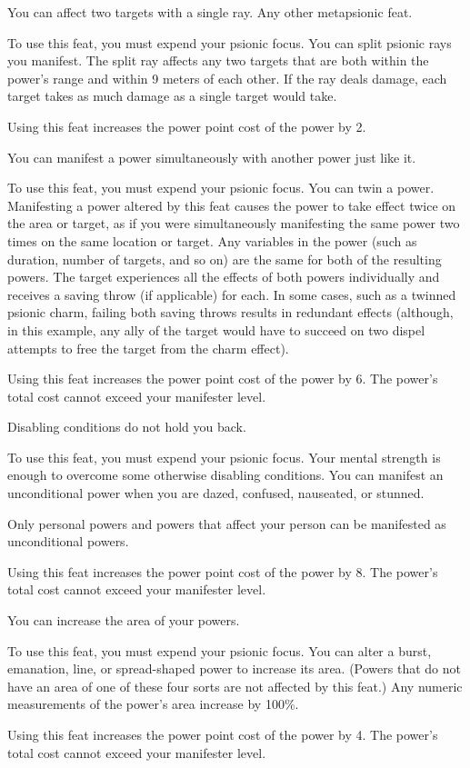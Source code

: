 {You can affect two targets with a single ray.}
{Any other metapsionic feat.}
{To use this feat, you must expend your psionic focus. You can split psionic rays you manifest. The split ray affects any two targets that are both within the power's range and within 9 meters of each other. If the ray deals damage, each target takes as much damage as a single target would take.

Using this feat increases the power point cost of the power by 2.}{}{}

{You can manifest a power simultaneously with another power just like it.}
{}
{To use this feat, you must expend your psionic focus. You can twin a power. Manifesting a power altered by this feat causes the power to take effect twice on the area or target, as if you were simultaneously manifesting the same power two times on the same location or target. Any variables in the power (such as duration, number of targets, and so on) are the same for both of the resulting powers. The target experiences all the effects of both powers individually and receives a saving throw (if applicable) for each. In some cases, such as a twinned psionic charm, failing both saving throws results in redundant effects (although, in this example, any ally of the target would have to succeed on two dispel attempts to free the target from the charm effect).

Using this feat increases the power point cost of the power by 6. The power's total cost cannot exceed your manifester level.}{}{}

{Disabling conditions do not hold you back.}
{}
{To use this feat, you must expend your psionic focus. Your mental strength is enough to overcome some otherwise disabling conditions. You can manifest an unconditional power when you are dazed, confused, nauseated, or stunned.

Only personal powers and powers that affect your person can be manifested as unconditional powers.

Using this feat increases the power point cost of the power by 8. The power's total cost cannot exceed your manifester level.}{}{}

{You can increase the area of your powers.}
{}
{To use this feat, you must expend your psionic focus. You can alter a burst, emanation, line, or spread-shaped power to increase its area. (Powers that do not have an area of one of these four sorts are not affected by this feat.) Any numeric measurements of the power's area increase by 100\%.

Using this feat increases the power point cost of the power by 4. The power's total cost cannot exceed your manifester level.}{}{}
